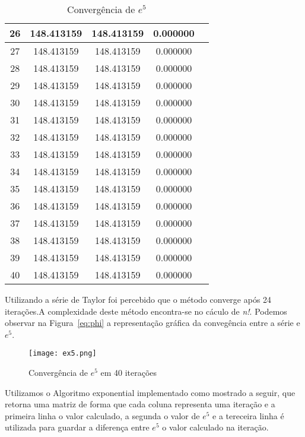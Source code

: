 \begin{table}[H]
\begin{tabular}{|c|c|c|c|c|}
				\hline
				26 & 148.413159 & 148.413159 & 0.000000\\
				\hline
				27 & 148.413159 & 148.413159 & 0.000000\\
				\hline
				28 & 148.413159 & 148.413159 & 0.000000\\
				\hline
				29 & 148.413159 & 148.413159 & 0.000000\\
				\hline
				30 & 148.413159 & 148.413159 & 0.000000\\
				\hline
				31 & 148.413159 & 148.413159 & 0.000000\\
				\hline
				32 & 148.413159 & 148.413159 & 0.000000\\
				\hline
				33 & 148.413159 & 148.413159 & 0.000000\\
				\hline
				34 & 148.413159 & 148.413159 & 0.000000\\
				\hline
				35 & 148.413159 & 148.413159 & 0.000000\\
				\hline
				36 & 148.413159 & 148.413159 & 0.000000\\
				\hline
				37 & 148.413159 & 148.413159 & 0.000000\\
				\hline
				38 & 148.413159 & 148.413159 & 0.000000\\
				\hline
				39 & 148.413159 & 148.413159 & 0.000000\\
				\hline
				40 & 148.413159 & 148.413159 & 0.000000\\
				\hline
			\end{tabular}
			\label{ex_table}
			\caption{Convergência de $e^5$}
		\end{table}

		Utilizando a série de Taylor foi percebido que o método converge após 24
		iterações.A complexidade deste método encontra-se no cáculo de
		\emph{n!}.  Podemos observar na Figura~\ref{eq:phi} a representação
		gráfica da convegência entre a série e $e^5$. 

		\begin{figure}[H] \centering
			\texttt{[image: ex5.png]} 
		\caption{Convergência de $e^5$ em 40 iterações}
		\label{ex5} 
		\end{figure}

		Utilizamos o Algoritmo exponential implementado como mostrado a seguir,
		que retorna uma matriz de forma que cada coluna representa uma iteração
		e a primeira linha o valor calculado, a segunda o valor de $e^5$ e a
		tereceira linha é utilizada para guardar a diferença entre $e^5$ o valor
		calculado na iteração.

